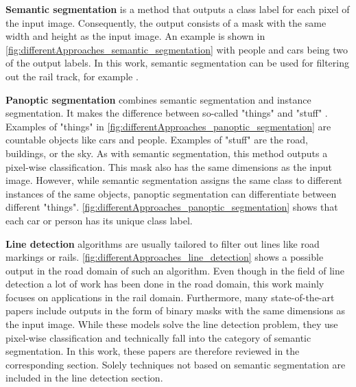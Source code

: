 \vspace{1cm} %

\noindent\textbf{Semantic segmentation} is a method that outputs a class label for each pixel of the input image.
Consequently, the output consists of a mask with the same width and height as the input image.
An example is shown in \autoref{fig:differentApproaches_semantic_segmentation} with people and cars being two of the output labels.
In this work, semantic segmentation can be used for filtering out the rail track, for example \cite{panopticsegmentation2019}.

\vspace{1cm} %

\noindent\textbf{Panoptic segmentation} combines semantic segmentation and instance segmentation.
It makes the difference between so-called "things" and "stuff" \cite{panopticsegmentation2019}.
Examples of "things" in \autoref{fig:differentApproaches_panoptic_segmentation} are countable objects like cars and people.
Examples of "stuff" are the road, buildings, or the sky.
As with semantic segmentation, this method outputs a pixel-wise classification.
This mask also has the same dimensions as the input image.
However, while semantic segmentation assigns the same class to different instances of the same objects, panoptic segmentation can differentiate between different "things".
\autoref{fig:differentApproaches_panoptic_segmentation} shows that each car or person has its unique class label.

\vspace{1cm} %

\noindent\textbf{Line detection} algorithms are usually tailored to filter out lines like road markings or rails.
\autoref{fig:differentApproaches_line_detection} shows a possible output in the road domain of such an algorithm.
Even though in the field of line detection a lot of work has been done in the road domain, this work mainly focuses on applications in the rail domain.
Furthermore, many state-of-the-art papers include outputs in the form of binary masks with the same dimensions as the input image.
While these models solve the line detection problem, they use pixel-wise classification and technically fall into the category of semantic segmentation.
In this work, these papers are therefore reviewed in the corresponding section.
Solely techniques not based on semantic segmentation are included in the line detection section.

